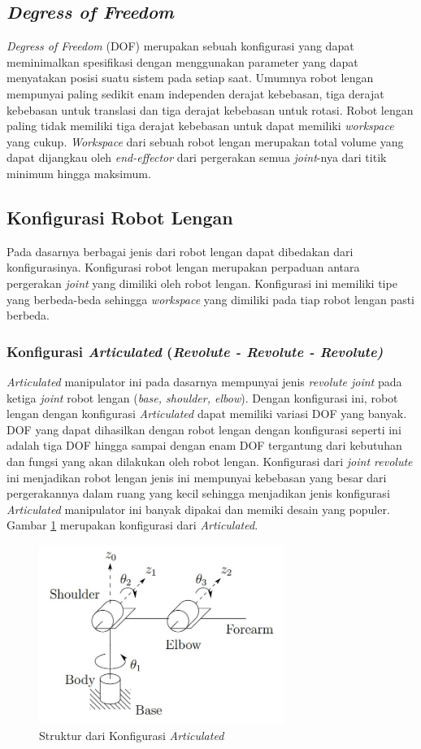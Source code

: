 \subsection{\emph{Degress of Freedom }}
\emph{Degress of Freedom} (DOF) merupakan sebuah konfigurasi yang dapat meminimalkan spesifikasi dengan menggunakan parameter yang dapat menyatakan posisi suatu sistem pada setiap saat. Umumnya robot lengan mempunyai paling sedikit enam independen derajat kebebasan, tiga derajat kebebasan untuk translasi dan tiga derajat kebebasan untuk rotasi. Robot lengan paling tidak memiliki tiga derajat kebebasan untuk dapat memiliki \emph{workspace} yang cukup. \emph{Workspace} dari sebuah robot lengan merupakan total volume yang dapat dijangkau oleh \emph{end-effector} dari pergerakan semua \emph{joint}-nya dari titik minimum hingga maksimum. 

\subsection{Konfigurasi Robot Lengan}
Pada dasarnya berbagai jenis dari robot lengan dapat dibedakan dari konfigurasinya. Konfigurasi robot lengan merupakan perpaduan antara pergerakan \emph{joint} yang dimiliki oleh robot lengan. Konfigurasi ini memiliki tipe yang berbeda-beda sehingga \emph {workspace} yang dimiliki pada tiap robot lengan pasti berbeda.

\subsubsection{Konfigurasi \emph{Articulated} (\emph{Revolute - Revolute - Revolute)}} 
\emph{Articulated} manipulator ini pada dasarnya mempunyai jenis \emph{revolute joint} pada ketiga \emph{joint} robot lengan (\emph {base, shoulder, elbow}). Dengan konfigurasi ini, robot lengan dengan konfigurasi \textit{Articulated} dapat memiliki variasi DOF yang banyak. DOF yang dapat dihasilkan dengan robot lengan dengan konfigurasi seperti ini adalah tiga DOF hingga sampai dengan enam DOF tergantung dari kebutuhan dan fungsi yang akan dilakukan oleh robot lengan. Konfigurasi dari \textit{joint revolute} ini menjadikan robot lengan jenis ini mempunyai kebebasan yang besar dari pergerakannya dalam ruang yang kecil sehingga menjadikan jenis konfigurasi \textit{Articulated} manipulator ini banyak dipakai dan memiki desain yang populer. Gambar \ref{pic.articulated} merupakan konfigurasi dari \textit{Articulated}.
	\begin{figure}[H]
	\centering
	\includegraphics[width=8cm]{gambar/articulated.jpg}
	\caption{Struktur dari Konfigurasi  \textit{Articulated}}
	\label{pic.articulated}
\end{figure}
